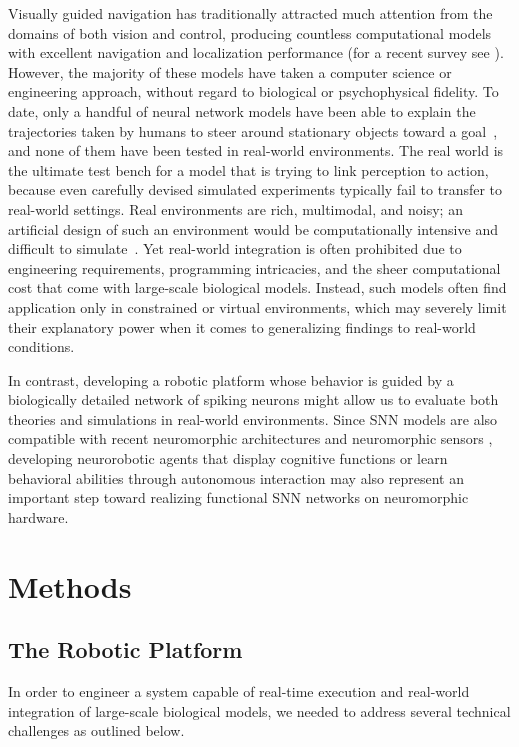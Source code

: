 Visually guided navigation has traditionally attracted much
attention from the domains of both vision and control, producing
countless computational models with excellent navigation and
localization performance (for a recent survey see 
\cite{Bonin-Font2008}).
However, the majority of these models have taken
a computer science or engineering approach, without regard to
biological or psychophysical fidelity. To date, only a handful of
neural network models have been able to explain the trajectories
taken by humans to steer around stationary objects toward a
goal~\citep{Browning2009a,Elder2009},
and none of them have been tested in real-world
environments. The real world is the ultimate test bench for
a model that is trying to link perception to action, because even
carefully devised simulated experiments typically fail to transfer
to real-world settings. Real environments are rich, multimodal,
and noisy; an artificial design of such an environment would be
computationally intensive and difficult to
simulate~\citep{KrichmarEdelman2006}.
Yet real-world integration is often prohibited due
to engineering requirements, programming intricacies, and the
sheer computational cost that come with large-scale biological
models. Instead, such models often find application only in
constrained or virtual environments, which may severely limit
their explanatory power when it comes to generalizing findings to
real-world conditions.

In contrast, developing a robotic platform whose behavior is guided by
a biologically detailed network of spiking neurons might allow us to
evaluate both theories and simulations in real-world environments.
Since \ac{SNN} models are also compatible with recent neuromorphic
architectures
\citep{Boahen2006,Cassidy2014,Khan2008,Schemmel2010,Srinivasa2012}
and neuromorphic sensors \citep{Lichtsteiner2008,Liu2010,WenBoahen2009},
developing neurorobotic agents that display cognitive functions or
learn behavioral abilities through autonomous interaction may
also represent an important step toward realizing functional 
\ac{SNN} networks on neuromorphic hardware.



\section{Methods}

\subsection{The Robotic Platform}
\label{sec:ABR|robot}
In order to engineer a system capable of real-time execution and
real-world integration of large-scale biological models, we needed
to address several technical challenges as outlined below.

